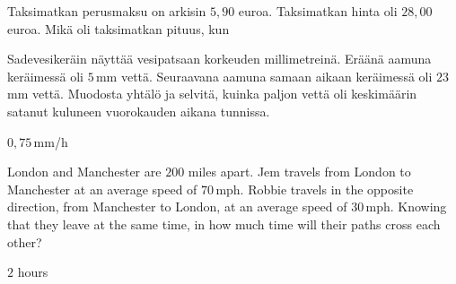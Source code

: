\begin{tehtavasivu}
\begin{tehtava}
\begin{vastaus}
\end{vastaus}
\end{tehtava}

\begin{tehtava}
 Taksimatkan perusmaksu on arkisin $5,90$ euroa. Taksimatkan hinta oli $28,00$ euroa. Mikä oli taksimatkan pituus, kun
	\begin{vastaus}
	\end{vastaus}
\end{tehtava}

\begin{tehtava}
Sadevesikeräin näyttää vesipatsaan korkeuden millimetreinä. Eräänä aamuna keräimessä oli $5$\,mm vettä. Seuraavana aamuna samaan aikaan keräimessä oli $23$\,mm vettä. Muodosta yhtälö ja selvitä, kuinka paljon vettä oli keskimäärin satanut kuluneen vuorokauden aikana tunnissa.
	\begin{vastaus}
	$0,75$\,mm/h
	\end{vastaus}
\end{tehtava}

\begin{tehtava}
London and Manchester are $200$ miles apart. Jem travels from London to Manchester at an average speed of $70$\,mph. Robbie travels in the opposite direction, from Manchester to London, at an average speed of $30$\,mph. Knowing that they leave at the same time, in how much time will their paths cross each other?
	\begin{vastaus}
		$2$ hours
	\end{vastaus}
\end{tehtava}


\end{tehtavasivu}
